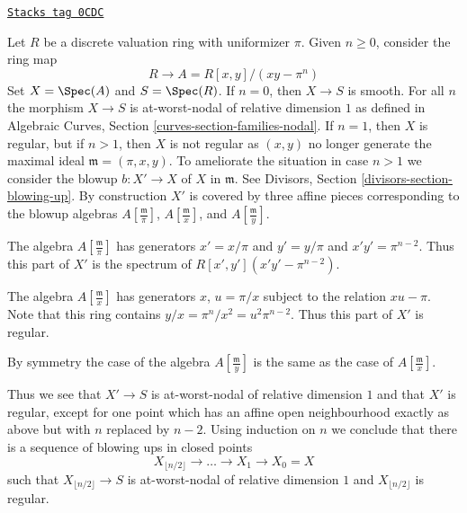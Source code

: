 \begin{example}[Blowup]
\label{models-example-blowup}
\href{https://stacks.math.columbia.edu/tag/0CDC}{\texttt{Stacks tag 0CDC}}

Let $R$ be a discrete valuation ring with uniformizer $\pi$.
Given $n \geq 0$, consider the ring map
$$
R \longrightarrow A = R[x, y]/(xy - \pi^n)
$$
Set $X = \Spec(A)$ and $S = \Spec(R)$.
If $n = 0$, then $X \to S$ is smooth.
For all $n$ the morphism $X \to S$ is at-worst-nodal
of relative dimension $1$ as defined in
Algebraic Curves, Section \ref{curves-section-families-nodal}.
If $n = 1$, then $X$ is regular, but if $n > 1$, then $X$ is not
regular as $(x, y)$ no longer generate the maximal ideal
$\mathfrak m = (\pi, x, y)$. To ameliorate the situation
in case $n > 1$ we
consider the blowup $b : X' \to X$ of $X$ in $\mathfrak m$.
See Divisors, Section \ref{divisors-section-blowing-up}.
By construction $X'$ is covered by three affine pieces
corresponding to the blowup algebras $A[\frac{\mathfrak m}{\pi}]$,
$A[\frac{\mathfrak m}{x}]$, and $A[\frac{\mathfrak m}{y}]$.

\medskip\noindent
The algebra $A[\frac{\mathfrak m}{\pi}]$ has generators
$x' = x/\pi$ and $y' = y/\pi$ and $x'y' = \pi^{n - 2}$.
Thus this part of $X'$ is the spectrum of $R[x', y'](x'y' - \pi^{n - 2})$.

\medskip\noindent
The algebra $A[\frac{\mathfrak m}{x}]$ has generators $x$,
$u = \pi/x$ subject to the relation $xu - \pi$. Note that this ring
contains $y/x = \pi^n/x^2 = u^2\pi^{n - 2}$. Thus this part of
$X'$ is regular.

\medskip\noindent
By symmetry the case of the algebra $A[\frac{\mathfrak m}{y}]$ is
the same as the case of $A[\frac{\mathfrak m}{x}]$.

\medskip\noindent
Thus we see that $X' \to S$ is at-worst-nodal of relative dimension $1$
and that $X'$ is regular, except for one point which has an
affine open neighbourhood exactly as above but with $n$ replaced by $n - 2$.
Using induction on $n$ we conclude that there is a sequence of
blowing ups in closed points
$$
X_{\lfloor n/2 \rfloor} \to \ldots \to X_1 \to X_0 = X
$$
such that $X_{\lfloor n/2 \rfloor} \to S$ is
at-worst-nodal of relative dimension $1$ and
$X_{\lfloor n/2 \rfloor}$ is regular.
\end{example}

